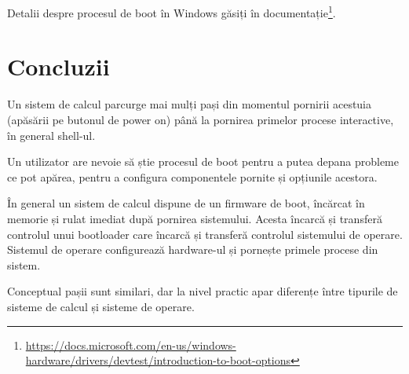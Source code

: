 Detalii despre procesul de boot în Windows găsiți în
documentație\footnote{\url{https://docs.microsoft.com/en-us/windows-hardware/drivers/devtest/introduction-to-boot-options}}.

\section{Concluzii}
\label{sec:boot-colcuzii}

Un sistem de calcul parcurge mai mulți pași din momentul pornirii acestuia
(apăsării pe butonul de power on) până la pornirea primelor procese interactive,
în general shell-ul.

Un utilizator are nevoie să știe procesul de boot pentru a putea depana probleme
ce pot apărea, pentru a configura componentele pornite și opțiunile acestora.

În general un sistem de calcul dispune de un firmware de boot, încărcat în
memorie și rulat imediat după pornirea sistemului. Acesta încarcă și transferă
controlul unui bootloader care încarcă și transferă controlul sistemului de
operare. Sistemul de operare configurează hardware-ul și pornește primele
procese din sistem.

Conceptual pașii sunt similari, dar la nivel practic apar diferențe între
tipurile de sisteme de calcul și sisteme de operare.
